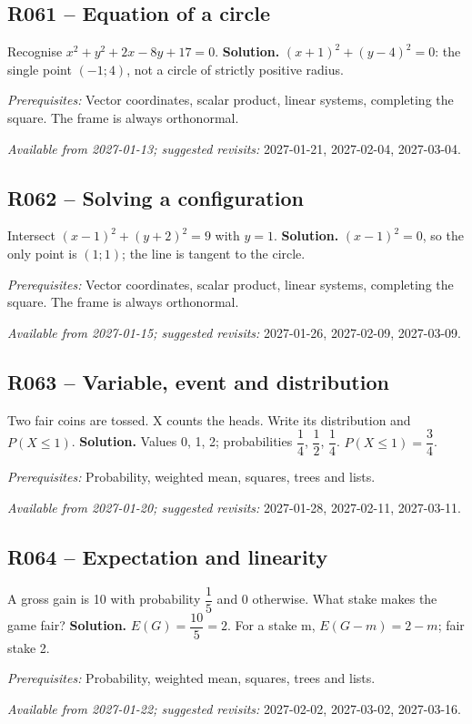 \subsection*{R061 -- Equation of a circle}\label{R061}
Recognise $x^2+y^2+2x-8y+17=0$.
\ifprof\textbf{Solution.} $(x+1)^2+(y-4)^2=0$: the single point $(-1;4)$, not a circle of strictly positive radius.\par\textit{Prerequisites:} Vector coordinates, scalar product, linear systems, completing the square. The frame is always orthonormal.\par\textit{Available from 2027-01-13; suggested revisits:} 2027-01-21, 2027-02-04, 2027-03-04.\fi
{}\subsection*{R062 -- Solving a configuration}\label{R062}
Intersect $(x-1)^2+(y+2)^2=9$ with $y=1$.
\ifprof\textbf{Solution.} $(x-1)^2=0$, so the only point is $(1;1)$; the line is tangent to the circle.\par\textit{Prerequisites:} Vector coordinates, scalar product, linear systems, completing the square. The frame is always orthonormal.\par\textit{Available from 2027-01-15; suggested revisits:} 2027-01-26, 2027-02-09, 2027-03-09.\fi
{}\subsection*{R063 -- Variable, event and distribution}\label{R063}
Two fair coins are tossed. X counts the heads. Write its distribution and $P(X\leq1)$.
\ifprof\textbf{Solution.} Values 0, 1, 2; probabilities $\dfrac{1}{4}$, $\dfrac{1}{2}$, $\dfrac{1}{4}$. $P(X\leq1)=\dfrac{3}{4}$.\par\textit{Prerequisites:} Probability, weighted mean, squares, trees and lists.\par\textit{Available from 2027-01-20; suggested revisits:} 2027-01-28, 2027-02-11, 2027-03-11.\fi
{}\subsection*{R064 -- Expectation and linearity}\label{R064}
A gross gain is 10 with probability $\dfrac{1}{5}$ and 0 otherwise. What stake makes the game fair?
\ifprof\textbf{Solution.} $E(G)=\dfrac{10}{5}=2$. For a stake m, $E(G-m)=2-m$; fair stake 2.\par\textit{Prerequisites:} Probability, weighted mean, squares, trees and lists.\par\textit{Available from 2027-01-22; suggested revisits:} 2027-02-02, 2027-03-02, 2027-03-16.\fi

